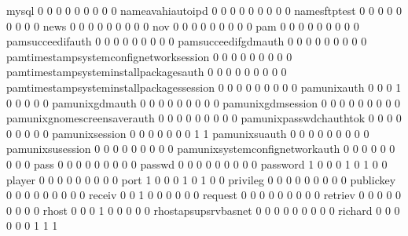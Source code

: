 \documentclass[compress,8pt]{beamer}
\begin{document}
\begin{frame}
\begin{Schunk}
  mysql                                      0   0   0   0   0   0   0   0   0
  nameavahiautoipd                           0   0   0   0   0   0   0   0   0
  namesftptest                               0   0   0   0   0   0   0   0   0
  news                                       0   0   0   0   0   0   0   0   0
  nov                                        0   0   0   0   0   0   0   0   0
  pam                                        0   0   0   0   0   0   0   0   0
  pamsucceedifauth                           0   0   0   0   0   0   0   0   0
  pamsucceedifgdmauth                        0   0   0   0   0   0   0   0   0
  pamtimestampsystemconfignetworksession     0   0   0   0   0   0   0   0   0
  pamtimestampsysteminstallpackagesauth      0   0   0   0   0   0   0   0   0
  pamtimestampsysteminstallpackagessession   0   0   0   0   0   0   0   0   0
  pamunixauth                                0   0   0   1   0   0   0   0   0
  pamunixgdmauth                             0   0   0   0   0   0   0   0   0
  pamunixgdmsession                          0   0   0   0   0   0   0   0   0
  pamunixgnomescreensaverauth                0   0   0   0   0   0   0   0   0
  pamunixpasswdchauthtok                     0   0   0   0   0   0   0   0   0
  pamunixsession                             0   0   0   0   0   0   0   1   1
  pamunixsuauth                              0   0   0   0   0   0   0   0   0
  pamunixsusession                           0   0   0   0   0   0   0   0   0
  pamunixsystemconfignetworkauth             0   0   0   0   0   0   0   0   0
  pass                                       0   0   0   0   0   0   0   0   0
  passwd                                     0   0   0   0   0   0   0   0   0
  password                                   1   0   0   0   1   0   1   0   0
  player                                     0   0   0   0   0   0   0   0   0
  port                                       1   0   0   0   1   0   1   0   0
  privileg                                   0   0   0   0   0   0   0   0   0
  publickey                                  0   0   0   0   0   0   0   0   0
  receiv                                     0   0   1   0   0   0   0   0   0
  request                                    0   0   0   0   0   0   0   0   0
  retriev                                    0   0   0   0   0   0   0   0   0
  rhost                                      0   0   0   1   0   0   0   0   0
  rhostapsupsrvbasnet                        0   0   0   0   0   0   0   0   0
  richard                                    0   0   0   0   0   0   1   1   1

\end{Schunk}
\end{frame}
\end{document}
